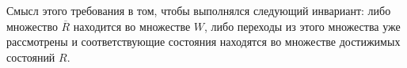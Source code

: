 Смысл этого требования в том, чтобы выполнялся следующий инвариант: либо множество $\overline{R}$ находится во множестве $W$, либо переходы из этого множества уже рассмотрены и соответствующие состояния находятся во множестве достижимых состояний $R$.

%
%
%
%

